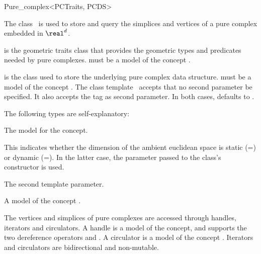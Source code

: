\begin{ccRefClass}{Pure_complex<PCTraits, PCDS>}

\ccDefinition

The class \ccRefName\ is used to store and query the simplices and vertices of
a pure complex embedded in $\real^d$.


\ccParameters

 is the geometric traits class that provides the geometric types
and predicates needed by pure complexes.  must be a model of the
concept .

 is the class used to store the underlying pure complex data
structure.  must be a model of the concept
. The class template \ccRefName\ accepts that no
second parameter be specified. It also accepts the tag  as
second parameter. In both cases,  defaults to
.

\ccTypes

The following types are self-explanatory:

%
{The model for the  concept.}


%
{This indicates whether the dimension of the ambient euclidean space is static
(=\ccGlobalScope{}) or
dynamic (=\ccGlobalScope{}).
In the latter case, the  parameter passed to the class's constructor
is used.}

%
{The second template parameter.}

\ccGlue
{}
\ccGlue
{}
\ccGlue
{}%
{A model of the concept .}

The vertices and simplices of pure complexes are accessed through handles,
iterators and circulators. A handle is a model of the  concept,
and supports the two dereference operators  and
. A circulator is a model of the concept .
Iterators and circulators are bidirectional and non-mutable.


\end{ccRefClass}
